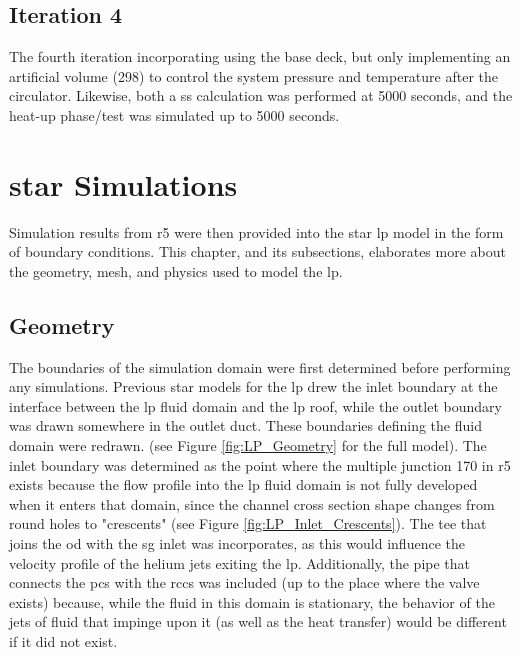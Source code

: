 \documentclass[double,12pt]{beavtex}
\begin{document}
\subsection{Iteration 4}

The fourth iteration incorporating using the base deck, but only implementing an artificial volume (298) to control the system pressure and temperature after the circulator. Likewise, both a \acrshort{ss} calculation was performed at 5000 seconds, and the heat-up phase/test was simulated up to 5000 seconds. 


\section{\acrshort{star} Simulations}

Simulation results from \acrshort{r5} were then provided into the \acrshort{star} \acrshort{lp} model in the form of boundary conditions. This chapter, and its subsections, elaborates more about the geometry, mesh, and physics used to model the \acrshort{lp}.

\subsection{Geometry}

The boundaries of the simulation domain were first determined before performing any simulations. Previous \acrshort{star} models for the \acrshort{lp} drew the inlet boundary at the interface between the \acrshort{lp} fluid domain and the \acrshort{lp} roof, while the outlet boundary was drawn somewhere in the outlet duct. These boundaries defining the fluid domain were redrawn. (see Figure \ref{fig:LP_Geometry} for the full model). The inlet boundary was determined as the point where the multiple junction 170 in \acrshort{r5} exists because the flow profile into the \acrshort{lp} fluid domain is not fully developed when it enters that domain, since the channel cross section shape changes from round holes to "crescents" (see Figure \ref{fig:LP_Inlet_Crescents}). The tee that joins the \acrshort{od} with the \acrshort{sg} inlet was incorporates, as this would influence the velocity profile of the helium jets exiting the \acrshort{lp}. Additionally, the pipe that connects the \acrshort{pcs} with the \acrshort{rccs} was included (up to the place where the valve exists) because, while the fluid in this domain is stationary, the behavior of the jets of fluid that impinge upon it (as well as the heat transfer) would be different if it did not exist.  
\end{document}

